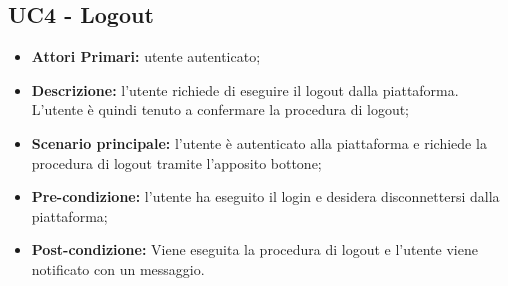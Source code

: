 \subsection{UC4 - Logout}
\begin{itemize}
	\item \textbf{Attori Primari:} utente autenticato;
	\item \textbf{Descrizione:} l'utente richiede di eseguire il logout dalla piattaforma. L'utente è quindi tenuto a confermare la procedura di logout;
	\item \textbf{Scenario principale:} l'utente è autenticato alla piattaforma e richiede la procedura di logout tramite l'apposito bottone;
	\item \textbf{Pre-condizione:} l'utente ha eseguito il login e desidera disconnettersi dalla piattaforma;
	\item \textbf{Post-condizione:} Viene eseguita la procedura di logout e l'utente viene notificato con un messaggio.
\end{itemize}

